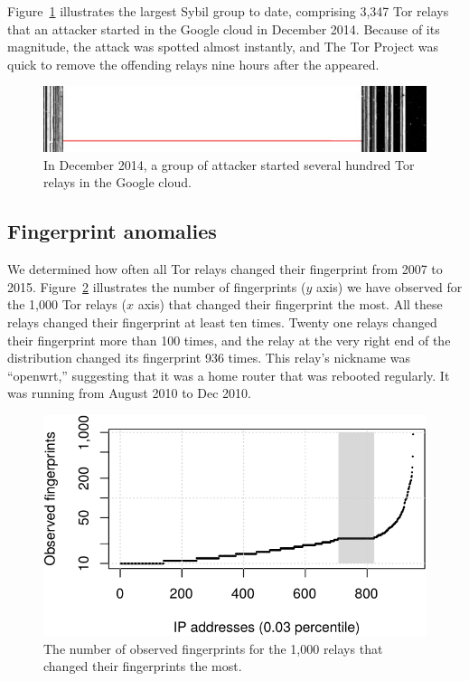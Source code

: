 Figure~\ref{fig:2014-12-lizard} illustrates the largest Sybil group to date,
comprising 3,347 Tor relays that an attacker started in the Google cloud in
December 2014.  Because of its magnitude, the attack was spotted almost
instantly, and The Tor Project was quick to remove the offending relays nine
hours after the appeared.

\begin{figure}[t]
	\centering
	\includegraphics[width=\linewidth]{diagrams/2014-12.jpg}
	\caption{In December 2014, a group of attacker started several hundred Tor
		relays in the Google cloud.}
	\label{fig:2014-12-lizard}
\end{figure}

\subsection{Fingerprint anomalies}
\label{sec:fingerprint-anomalies}
We determined how often all Tor relays changed their fingerprint from 2007 to
2015.  Figure~\ref{fig:fingerprints} illustrates the number of fingerprints ($y$
axis) we have observed for the 1,000 Tor relays ($x$ axis) that changed their
fingerprint the most.  All these relays changed their fingerprint at least ten
times.  Twenty one relays changed their fingerprint more than 100 times, and the
relay at the very right end of the distribution changed its fingerprint 936
times.  This relay's nickname was ``openwrt,'' suggesting that it was a home
router that was rebooted regularly.  It was running from August 2010 to Dec
2010.

\begin{figure}[t]
	\centering
	\includegraphics[width=0.8\linewidth]{diagrams/fingerprints.pdf}
	\caption{The number of observed fingerprints for the 1,000 relays that
	changed their fingerprints the most.}
	\label{fig:fingerprints}
\end{figure}

